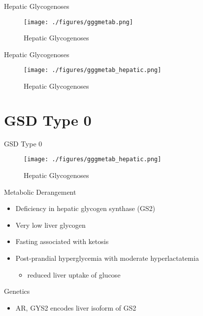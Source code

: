 \documentclass[presentation, smaller]{beamer}
\begin{document}
\begin{frame}[label={sec:org13cfa7b}]{Hepatic Glycogenoses}
\begin{figure}[htbp]
\centering
\texttt{[image: ./figures/gggmetab.png]}
\caption[Hepatic Glycogenoses]{\label{fig:orgb99161a}
Hepatic Glycogenoses}
\end{figure}
\end{frame}



\begin{frame}[label={sec:org2cc23ea}]{Hepatic Glycogenoses}
\begin{figure}[htbp]
\centering
\texttt{[image: ./figures/gggmetab\_hepatic.png]}
\caption[Hepatic Glycogenoses]{\label{fig:org5fbc06b}
Hepatic Glycogenoses}
\end{figure}
\end{frame}


\section{GSD Type 0}
\label{sec:orgb0f82b0}
\begin{frame}[label={sec:orga7abb6a}]{GSD Type 0}
\begin{figure}[htbp]
\centering
\texttt{[image: ./figures/gggmetab\_hepatic.png]}
\caption[Hepatic Glycogenoses]{\label{fig:org155ad6b}
Hepatic Glycogenoses}
\end{figure}
\end{frame}

\begin{frame}[label={sec:org8268871}]{Metabolic Derangement}
\begin{itemize}
\item Deficiency in hepatic glycogen synthase (GS2)
\item Very low liver glycogen
\item Fasting associated with ketosis
\item Post-prandial hyperglycemia with moderate hyperlactatemia
\begin{itemize}
\item reduced liver uptake of glucose
\end{itemize}
\end{itemize}
\end{frame}

\begin{frame}[label={sec:orgc1690f1}]{Genetics}
\begin{itemize}
\item AR, GYS2 encodes liver isoform of GS2
\end{itemize}
\end{frame}
\end{document}

